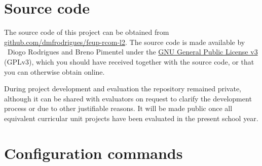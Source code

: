 \documentclass[a4paper, 11pt]{report}
\begin{document}



\appendix
\appendixpage
\addappheadtotoc
\chapter{Source code}

The source code of this project can be obtained from \href{https://github.com/dmfrodrigues/feup-rcom-l2}{github.com/dmfrodrigues/feup-rcom-l2}.
The source code is made available by \textcopyright~Diogo Rodrigues and Breno Pimentel under the \href{https://www.gnu.org/licenses/gpl-3.0.en.html}{GNU General Public License v3} (GPLv3), which you should have received together with the source code, or that you can otherwise obtain online.

During project development and evaluation the repository remained private, although it can be shared with evaluators on request to clarify the development process or due to other justifiable reasons.
It will be made public once all equivalent curricular unit projects have been evaluated in the present school year.

\fancyhfoffset{0pt}










\restoregeometry

\chapter{Configuration commands}





\end{document}
